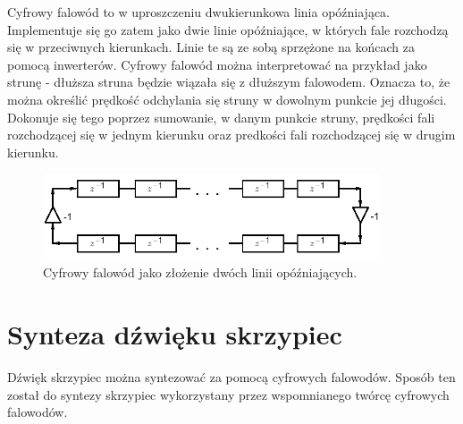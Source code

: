 
Cyfrowy falowód to w uproszczeniu dwukierunkowa linia opóźniająca. Implementuje się go zatem jako dwie linie opóźniające, w których fale rozchodzą się w przeciwnych kierunkach. Linie te są ze sobą sprzężone na końcach za pomocą inwerterów. Cyfrowy falowód można interpretować na przykład jako strunę - dłuższa struna będzie wiązała się z dłuższym falowodem. Oznacza to, że można określić prędkość odchylania się struny w dowolnym punkcie jej długości. Dokonuje się tego poprzez sumowanie, w danym punkcie struny, prędkości fali rozchodzącej się w jednym kierunku oraz predkości fali rozchodzącej się w drugim kierunku.
\begin{figure}[H]
	\centering
	\includegraphics[width=10cm]{grafiki/model_falowod}
	\captionsetup{justification=centering}
	\caption{Cyfrowy falowód jako złożenie dwóch linii opóźniających.}
	\label{rys:model_falowod}
\end{figure}
\section{Synteza dźwięku skrzypiec}
Dźwięk skrzypiec można syntezować za pomocą cyfrowych falowodów. Sposób ten został do syntezy skrzypiec wykorzystany przez wspomnianego twórcę cyfrowych falowodów.


